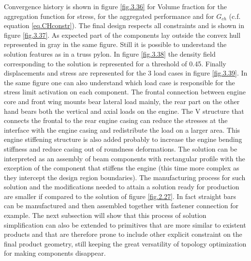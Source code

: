       Convergence history is shown in figure \ref{fig.3.36} for Volume fraction for the aggregation function for stress, for the aggregated performance and for $G_{ch}$ (c.f. equation \eqref{eq.CHconstr}). The final design respects all constraints and is shown in figure \ref{fig.3.37}. As expected part of the components lay outside the convex hull represented in gray in the same figure. Still it is possible to understand the solution features as in a truss pylon. In figure \ref{fig.3.38} the density field corresponding to the solution is represented for a threshold of 0.45. Finally displacements and stress are represented for the 3 load cases in figure \ref{fig.3.39}. In the same figure one can also understand  which load case is responsible for the stress limit activation on each component. The frontal connection between engine core and front wing mounts bear lateral load mainly, the rear part on the other hand bears both the vertical and axial loads on the engine. The V structure that connects the frontal to the rear engine casing can reduce the stresses at the interface with the engine casing and redistribute the load on a larger area. This engine stiffening structure is also added probably to increase the engine bending stiffness and reduce casing out of roundness deformations. The solution can be interpreted as an assembly of beam components with rectangular profile with the exception of the component that stiffens the engine (this time more complex as they intercept the design region boundaries). The manufacturing process for such solution and the modifications needed to attain a solution ready for production  are smaller if compared to the solution of figure \ref{fig.2.27}. In fact straight bars can be manufactured and then assembled together with fastener connection for example. The next subsection will show that this process of solution simplification can also be extended to primitives that are more similar to existent products and that are therefore prone to include other explicit constraint on the final product geometry, still keeping the great versatility of topology optimization for making components disappear.
